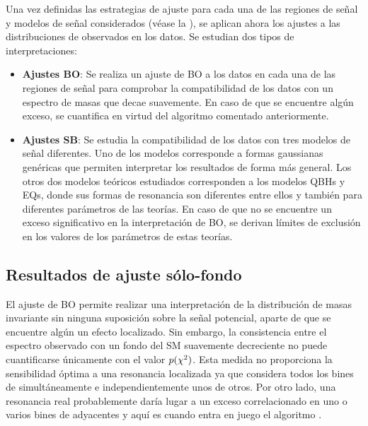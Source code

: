 Una vez definidas las estrategias de ajuste para cada una de las regiones de señal y modelos de señal considerados (véase la \Tab{\ref{tab:bkg:modeling:strategy_modeling:summary}}), se aplican ahora los ajustes a las distribuciones de \myj observados en los datos. Se estudian dos tipos de interpretaciones:
\begin{itemize}
    \item \textbf{Ajustes \Acf{BO}}: Se realiza un ajuste de \ac{BO} a los datos en cada una de las regiones de señal para comprobar la compatibilidad de los datos con un espectro de masas que decae suavemente. En caso de que se encuentre algún exceso, se cuantifica en virtud del algoritmo \bh comentado anteriormente.
    \item \textbf{Ajustes \Acf{SB}}: Se estudia la compatibilidad de los datos con tres modelos de señal diferentes. Uno de los modelos corresponde a formas gaussianas genéricas que permiten interpretar los resultados de forma más general. Los otros dos modelos teóricos estudiados corresponden a los modelos \acp{QBH} y \acp{EQ}, donde sus formas de resonancia son diferentes entre ellos y también para diferentes parámetros de las teorías. En caso de que no se encuentre un exceso significativo en la interpretación de \ac{BO}, se derivan límites de exclusión en los valores de los parámetros de estas teorías.
\end{itemize}







\subsection{Resultados de ajuste sólo-fondo}
\label{subsec:results:results:bkgonly}

El ajuste de \ac{BO} permite realizar una interpretación de la distribución de masas invariante sin ninguna suposición sobre la señal potencial, aparte de que se encuentre algún un efecto localizado. Sin embargo, la consistencia entre el espectro \myj observado con un fondo del \ac{SM} suavemente decreciente no puede cuantificarse únicamente con el valor \(p(\chi^{2})\). Esta medida no proporciona la sensibilidad óptima a una resonancia localizada ya que considera todos los bines de \myj simultáneamente e independientemente unos de otros. Por otro lado, una resonancia real probablemente daría lugar a un exceso correlacionado en uno o varios bines de \myj adyacentes y aquí es cuando entra en juego el algoritmo \bh.

